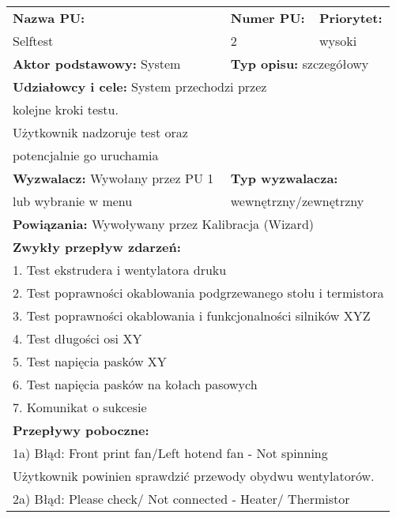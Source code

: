 \documentclass{article}
\begin{document}
\begin{enumerate}[label=\arabic*.]
\newpage
\begin{tabular}{|p{5cm}|p{3cm}|p{3cm}|p{3cm}|p{}|p{3cm}|}
\hline
\multicolumn{4}{|l|}{\textbf{Nazwa PU:}} & \multicolumn{1}{l|}{\textbf{Numer PU:}} & \multicolumn{1}{|l|}{\textbf{Priorytet:} } \\ 
\multicolumn{4}{|l|}{Selftest} & \multicolumn{1}{l|}{2} & \multicolumn{1}{|l|}{wysoki }\\ \hline
\multicolumn{3}{|l|}{\textbf{Aktor podstawowy:} System} & \multicolumn{3}{l|}{\textbf{Typ opisu:} szczegółowy} \\ \hline
\multicolumn{6}{|l|}{\textbf{Udziałowcy i cele:} System przechodzi przez} \\ 
\multicolumn{6}{|l|}{kolejne kroki testu.} \\
\multicolumn{6}{|l|}{Użytkownik nadzoruje test oraz} \\
\multicolumn{6}{|l|}{potencjalnie go uruchamia} \\ \hline
\multicolumn{3}{|l|}{\textbf{Wyzwalacz:} Wywołany przez PU 1} & \multicolumn{3}{l|}{\textbf{Typ wyzwalacza:}} \\ 
\multicolumn{3}{|l|}{lub wybranie w menu} & \multicolumn{3}{l|}{wewnętrzny/zewnętrzny} \\ \hline
\multicolumn{6}{|l|}{\textbf{Powiązania:} Wywoływany przez Kalibracja (Wizard)} \\
\hline
\multicolumn{6}{|l|}{\textbf{Zwykły przepływ zdarzeń:}} \\
\multicolumn{6}{|l|}{1. Test ekstrudera i wentylatora druku} \\
\multicolumn{6}{|l|}{2. Test poprawności okablowania podgrzewanego stołu i termistora} \\
\multicolumn{6}{|l|}{3. Test poprawności okablowania i funkcjonalności silników XYZ} \\
\multicolumn{6}{|l|}{4. Test długości osi XY} \\
\multicolumn{6}{|l|}{5. Test napięcia pasków XY} \\
\multicolumn{6}{|l|}{6. Test napięcia pasków na kołach pasowych} \\
\multicolumn{6}{|l|}{7. Komunikat o sukcesie} \\
\hline
\multicolumn{6}{|l|}{\textbf{Przepływy poboczne:}} \\
\multicolumn{6}{|l|}{1a) Błąd: Front print fan/Left hotend fan - Not spinning} \\ 
\multicolumn{6}{|l|}{Użytkownik powinien sprawdzić przewody obydwu wentylatorów.} \\ 
\multicolumn{6}{|l|}{2a) Błąd: Please check/ Not connected - Heater/ Thermistor} \\

\end{tabular}
\end{enumerate}
\end{document}

